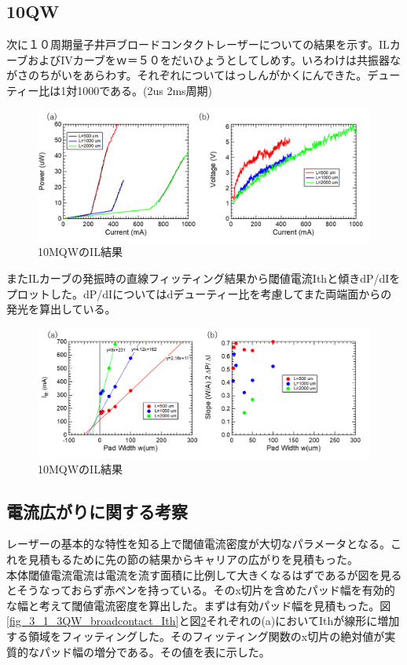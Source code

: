 \subsection{10QW}%
次に１０周期量子井戸ブロードコンタクトレーザーについての結果を示す。ILカーブおよびIVカーブをｗ＝５０をだいひょうとしてしめす。いろわけは共振器ながさのちがいをあらわす。それぞれについてはっしんがかくにんできた。デューティー比は1対1000である。(2us 2ms周期)
\begin{figure}[h]
	\centering
	\includegraphics[width=15cm]{figure/fig_3_1_10QW_broadcontact_IL.png}
		\caption{10MQWのIL結果}
		\label{fig_3_1_10QW_broadcontact_IL}
\end{figure}
またILカーブの発振時の直線フィッティング結果から閾値電流Ithと傾きdP/dIをプロットした。dP/dIについてはdデューティー比を考慮してまた両端面からの発光を算出している。
\begin{figure}[h]
	\centering
	\includegraphics[width=15cm]{figure/fig_3_1_10QW_broadcontact_Ith.png}
		\caption{10MQWのIL結果}
		\label{fig_3_1_10QW_broadcontact_Ith}
\end{figure}


\newpage
\subsection{電流広がりに関する考察}%
レーザーの基本的な特性を知る上で閾値電流密度が大切なパラメータとなる。これを見積もるために先の節の結果からキャリアの広がりを見積もった。\\
 本体閾値電流電流は電流を流す面積に比例して大きくなるはずであるが図を見るとそうなっておらず赤ペンを持っている。そのx切片を含めたパッド幅を有効的な幅と考えて閾値電流密度を算出した。まずは有効パッド幅を見積もった。図\ref{fig_3_1_3QW_broadcontact_Ith}と図\ref{fig_3_1_10QW_broadcontact_Ith}それぞれの(a)においてIthが線形に増加する領域をフィッティングした。そのフィッティング関数のx切片の絶対値が実質的なパッド幅の増分である。その値を表に示した。
 
